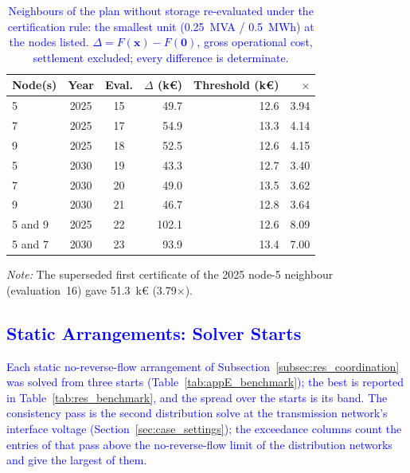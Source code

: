 \documentclass[preprint,12pt]{elsarticle}
\begin{document}
\begin{table}[htbp!]
    \centering
    \caption{\textcolor{blue}{Neighbours of the plan without storage re-evaluated under the certification rule: the smallest unit (0.25~MVA / 0.5~MWh) at the nodes listed. $\Delta = F(\boldsymbol{x}) - F(\boldsymbol{0})$, gross operational cost, settlement excluded; every difference is determinate.}}
    \label{tab:appE_neighbours}
    \scriptsize\setlength{\tabcolsep}{5pt}
    \begin{tabular}{l c c r r r}
        \toprule
        Node(s) & Year & Eval. & $\Delta$ (k\euro) & Threshold (k\euro) & $\times$ \\
        \midrule
        5 & 2025 & 15 & 49.7 & 12.6 & 3.94 \\
        7 & 2025 & 17 & 54.9 & 13.3 & 4.14 \\
        9 & 2025 & 18 & 52.5 & 12.6 & 4.15 \\
        5 & 2030 & 19 & 43.3 & 12.7 & 3.40 \\
        7 & 2030 & 20 & 49.0 & 13.5 & 3.62 \\
        9 & 2030 & 21 & 46.7 & 12.8 & 3.64 \\
        5 and 9 & 2025 & 22 & 102.1 & 12.6 & 8.09 \\
        5 and 7 & 2030 & 23 & 93.9 & 13.4 & 7.00 \\
        \bottomrule
    \end{tabular}
    \par\smallskip
    \begin{minipage}{0.80\linewidth}
        \scriptsize\raggedright
        \textit{Note:} The superseded first certificate of the 2025 node-5 neighbour (evaluation~16) gave 51.3~k\euro{} (3.79$\times$).
    \end{minipage}
\end{table}

\subsection{\textcolor{blue}{Static Arrangements: Solver Starts}}
\label{app:results_benchmark}

\textcolor{blue}{
    Each static no-reverse-flow arrangement of Subsection~\ref{subsec:res_coordination} was solved from three starts (Table~\ref{tab:appE_benchmark}); the best is reported in Table~\ref{tab:res_benchmark}, and the spread over the starts is its band. The consistency pass is the second distribution solve at the transmission network's interface voltage (Section~\ref{sec:case_settings}); the exceedance columns count the entries of that pass above the no-reverse-flow limit of the distribution networks and give the largest of them.
}
\end{document}
